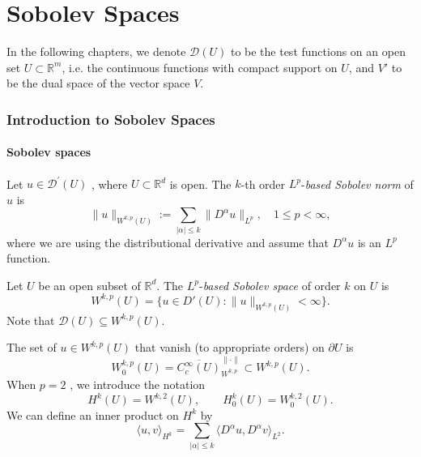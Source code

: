 \newcommand{\D}{\mathcal{D}}
\newcommand{\ran}[1]{\text{ran}\ {#1}}
\newcommand{\R}{\mathbb{R}}
\newcommand{\norm}[1]{\left\lVert #1 \right\rVert}
\newcommand{\abs}[1]{\left\lvert #1 \right\rvert}
\newcommand{\Lip}{\operatorname{Lip}}
\newcommand{\supp}{\operatorname{supp}}
\newcommand{\osc}{\operatorname{osc}}



\part{Sobolev Spaces}

In the following chapters, we denote $\D(U)$ to be the test functions on an open set $U\subset\mathbb{R}^m$, i.e. the continuous functions with compact support on $U$, and $V'$ to be the dual space of the vector space $V$.

\section{Introduction to Sobolev Spaces}
\subsection{Sobolev spaces}
\begin{definition}
Let $u\in \D^{\prime}(U)$ , where \(U\subset \mathbb{R}^{d}\) is open. The \(k\)-th order \(L^{p}\)-\emph{based Sobolev norm} of \(u\) is
\[
\| u\|_{W^{k,p}(U)} := \sum_{|\alpha |\leq k} \| D^{\alpha} u\|_{L^{p}}, \quad 1 \leq p < \infty ,
\]
where we are using the distributional derivative and assume that \(D^{\alpha} u\) is an \(L^{p}\) function.
\end{definition}

\begin{definition}
Let \(U\) be an open subset of \(\mathbb{R}^{d}\). The \(L^{p}\)-\emph{based Sobolev space} of order \(k\) on \(U\) is
\[
W^{k,p}(U) = \{u\in D'(U):\| u\|_{W^{k,p}(U)}< \infty \} .
\]
Note that \(\D(U) \subseteq W^{k,p}(U)\).
\end{definition}

\begin{definition}
The set of \(u \in W^{k,p}(U)\) that vanish (to appropriate orders) on \(\partial U\) is
\[
W_{0}^{k,p}(U) = \overline{C_{c}^{\infty}(U)}^{\| \cdot \|}_{W^{k,p}}\subset W^{k,p}(U).
\]
When \(p = 2\) , we introduce the notation
\[
H^{k}(U) = W^{k,2}(U), \qquad H_{0}^{k}(U) = W_{0}^{k,2}(U).
\]
We can define an inner product on \(H^{k}\) by
\[
\langle u,v\rangle_{H^{k}} = \sum_{|\alpha |\leq k}\langle D^{\alpha}u,D^{\alpha}v\rangle_{L^{2}}.
\]
\end{definition}


